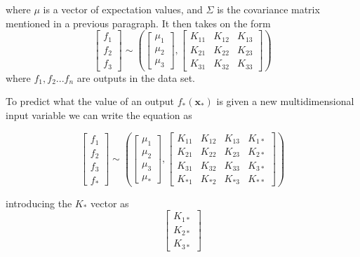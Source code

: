 \documentclass[12pt]{report}
\begin{document}
where $\mu$ is a vector of expectation values, and $\Sigma$ is the covariance matrix mentioned in a previous paragraph. It then takes on the form
\begin{equation}
	\left[ \begin{matrix} f_1\\f_2\\f_3\end{matrix} \right] \sim \left(\left[\begin{matrix} \mu_1\\\mu_2\\\mu_3\end{matrix}\right],\left[\begin{matrix}K_{11}&K_{12}&K_{13}\\K_{21}&K_{22}&K_{23}\\K_{31}&K_{32}
	&K_{33}\end{matrix}\right]\right)
	\label{eq:initial data matrix}
\end{equation}
where $f_1, f_2 ... f_n$ are outputs in the data set.

To predict what the value of an output $f_*(\boldsymbol{x_*})$ is given a new multidimensional input variable we can write the equation as

\begin{equation}
	\left[ \begin{matrix} f_1\\f_2\\f_3\\f_*\end{matrix} \right] \sim \left(\left[\begin{matrix} \mu_1\\\mu_2\\\mu_3\\\mu_*\end{matrix}\right],\left[\begin{matrix}K_{11}&K_{12}&K_{13}&K_{1*}
	\\K_{21}&K_{22}&K_{23}&K_{2*}
	\\K_{31}&K_{32}&K_{33}&K_{3*}
	\\K_{*1}&K_{*2}&K_{*3}&K_{**}
	\end{matrix}\right]\right)
	\label{eq:for new covariance}
\end{equation}

introducing the $K_*$ vector as 
\begin{equation}
	\left[\begin{matrix}
	K_{1*}\\K_{2*}\\K_{3*}	
	\end{matrix}\right]
	\label{eq:kstar vector}
\end{equation}
\end{document}

